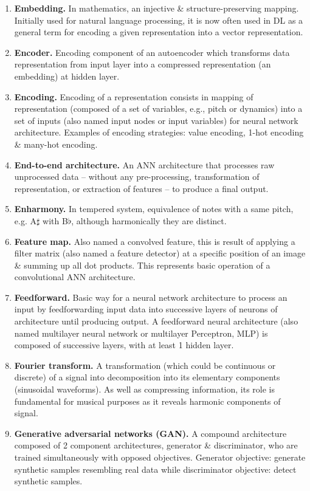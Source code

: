 \documentclass{article}
\begin{document}
\begin{itemize}
\begin{enumerate}
		\item {\bf Embedding.} In mathematics, an injective \& structure-preserving mapping. Initially used for natural language processing, it is now often used in DL as a general term for encoding a given representation into a vector representation.
		\item {\bf Encoder.} Encoding component of an autoencoder which transforms data representation from input layer into a compressed representation (an embedding) at hidden layer.
		\item {\bf Encoding.} Encoding of a representation consists in mapping of representation (composed of a set of variables, e.g., pitch or dynamics) into a set of inputs (also named input nodes or input variables) for neural network architecture. Examples of encoding strategies: value encoding, 1-hot encoding \& many-hot encoding.
		\item {\bf End-to-end architecture.} An ANN architecture that processes raw unprocessed data -- without any pre-processing, transformation of representation, or extraction of features -- to produce a final output.
		\item {\bf Enharmony.} In tempered system, equivalence of notes with a same pitch, e.g. A$\sharp$ with B$\flat$, although harmonically they are distinct.
		\item {\bf Feature map.} Also named a convolved feature, this is result of applying a filter matrix (also named a feature detector) at a specific position of an image \& summing up all dot products. This represents basic operation of a convolutional ANN architecture.
		\item {\bf Feedforward.} Basic way for a neural network architecture to process an input by feedforwarding input data into successive layers of neurons of architecture until producing output. A feedforward neural architecture (also named multilayer neural network or multilayer Perceptron, MLP) is composed of successive layers, with at least 1 hidden layer.
		\item {\bf Fourier transform.} A transformation (which could be continuous or discrete) of a signal into decomposition into its elementary components (sinusoidal waveforms). As well as compressing information, its role is fundamental for musical purposes as it reveals harmonic components of signal.
		\item {\bf Generative adversarial networks (GAN).} A compound architecture composed of 2 component architectures, generator \& discriminator, who are trained simultaneously with opposed objectives. Generator objective: generate synthetic samples resembling real data while discriminator objective: detect synthetic samples.

\end{enumerate}
\end{itemize}
\end{document}
